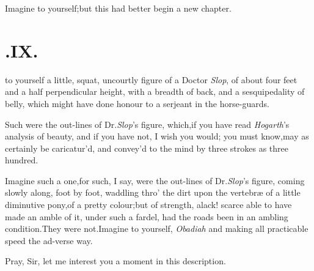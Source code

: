 \documentclass{article}
\begin{document}
Imagine to yourself;\tsk but this had better begin a new
chapter.


\section{.\enspace  IX.}

 to yourself a little, squat, uncourtly figure of a Doctor
\textit{Slop}, of\break
about four feet and a half perpendicular
height, with a breadth of back, and a sesqui\-pedality of belly, which might have done honour to a serjeant in
the horse-guards.

Such were the out-lines of Dr.\@ \textit{Slop}’s figure, which,\tsk if you have read
\textit{Ho\-garth}’s analysis of beauty, and if you have not, I wish you would;\tsk
you must know,\break may as certainly be caricatur’d, and convey’d to the mind by three
strokes as three hundred.

Imagine such a one,\tsk for such, I say, were the out-lines of
Dr.\@ \textit{Slop}’s figure, coming slowly along, foot by foot,
waddling thro’ the dirt upon the vertebræ of a little
diminutive pony,\tsk of a pretty colour;\tsk but of strength,\tsk
alack!\tsh\break
scarce able to have made an amble of it,\break
under such a fardel, had the roads been
in an ambling condition.\tsh They were not.\tsh Imagine
to yourself, \textit{Obadiah}
and making all practicable speed the ad-\break verse way.

Pray, Sir, let me interest you a moment in this description.
\end{document}
